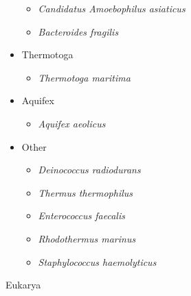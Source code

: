 \documentclass[10pt,letterpaper]{article}
\begin{document}
\begin{itemize}
	\begin{itemize}
		\item \textit{Candidatus Amoebophilus asiaticus}
		\item \textit{Bacteroides fragilis}
	\end{itemize}
	\item Thermotoga
	\begin{itemize}
		\item \textit{Thermotoga maritima}
	\end{itemize}
	\item Aquifex
	\begin{itemize}
		\item \textit{Aquifex aeolicus}
	\end{itemize}
	\item Other
	\begin{itemize}
		\item \textit{Deinococcus radiodurans}
		\item \textit{Thermus thermophilus}
		\item \textit{Enterococcus faecalis}
		\item \textit{Rhodothermus marinus}
		\item \textit{Staphylococcus haemolyticus}
	\end{itemize}
\end{itemize}


Eukarya
\end{document}
